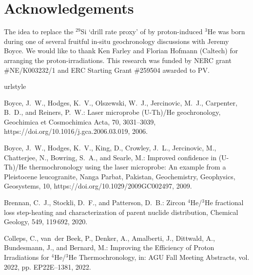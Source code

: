\documentclass{article}
\begin{document}
\section*{Acknowledgements}
The idea to replace the $^{29}$Si `drill rate proxy' of
\cite{vermeesch2012a} by proton-induced $^3$He was born during one of
several fruitful in-situ geochronology discussions with Jeremy
Boyce. We would like to thank Ken Farley and Florian Hofmann (Caltech)
for arranging the proton-irradiations. This research was funded by
NERC grant \#NE/K003232/1 and ERC Starting Grant \#259504 awarded to
PV.

%
%

\begin{thebibliography}{24}
\providecommand{\natexlab}[1]{#1}
\providecommand{\url}[1]{{\tt #1}}
\providecommand{\urlprefix}{URL }
\expandafter\ifx\csname urlstyle\endcsname\relax
  \providecommand{\doi}[1]{https://doi.org/\discretionary{}{}{}#1}\else
  \providecommand{\doi}{https://doi.org/\discretionary{}{}{}\begingroup
  \urlstyle{rm}\Url}\fi

{Boyce}, J.~W., {Hodges}, K.~V., {Olszewski}, W.~J., {Jercinovic}, M.~J.,
  {Carpenter}, B.~D., and {Reiners}, P.~W.: {Laser microprobe (U-Th)/He
  geochronology}, Geochimica et Cosmochimica Acta, 70, 3031--3039,
  \doi{10.1016/j.gca.2006.03.019}, 2006.

{Boyce}, J.~W., {Hodges}, K.~V., {King}, D., {Crowley}, J.~L., {Jercinovic},
  M., {Chatterjee}, N., {Bowring}, S.~A., and {Searle}, M.: {Improved
  confidence in (U-Th)/He thermochronology using the laser microprobe: An
  example from a Pleistocene leucogranite, Nanga Parbat, Pakistan},
  Geochemistry, Geophysics, Geosystems, 10, \doi{10.1029/2009GC002497}, 2009.

Brennan, C.~J., Stockli, D.~F., and Patterson, D.~B.: Zircon $^4$He/$^3$He
  fractional loss step-heating and characterization of parent nuclide
  distribution, Chemical Geology, 549, 119\,692, 2020.

Colleps, C., van~der Beek, P., Denker, A., Amalberti, J., Dittwald, A.,
  Bundesmann, J., and Bernard, M.: {Improving the Efficiency of Proton
  Irradiations for $^4$He/$^3$He Thermochronology}, in: AGU Fall Meeting
  Abstracts, vol. 2022, pp. EP22E--1381, 2022.


\end{thebibliography}
\end{document}
